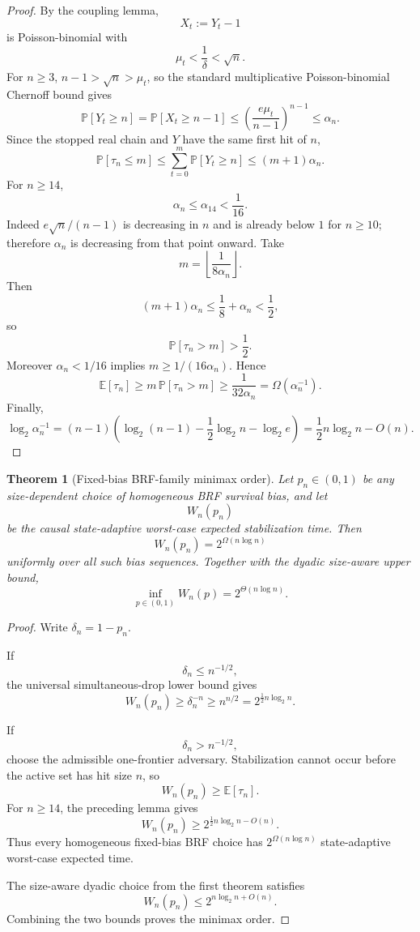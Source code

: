 \documentclass[11pt]{article}
\newtheorem{theorem}{Theorem}
\newcommand{\E}{\mathbb{E}}
\newcommand{\Prb}{\mathbb{P}}
\begin{document}
\begin{proof}
By the coupling lemma,
\[
  X_t:=Y_t-1
\]
is Poisson-binomial with
\[
  \mu_t<\frac1\delta<\sqrt n.
\]
For $n\ge3$, $n-1>\sqrt n>\mu_t$, so the standard multiplicative
Poisson-binomial Chernoff bound gives
\[
  \Prb[Y_t\ge n]
  =
  \Prb[X_t\ge n-1]
  \le
  {\left(
    \frac{e\mu_t}{n-1}
  \right)}^{n-1}
  \le
  \alpha_n.
\]
Since the stopped real chain and $Y$ have the same first hit of $n$,
\[
  \Prb[\tau_n\le m]
  \le
  \sum_{t=0}^{m}\Prb[Y_t\ge n]
  \le
  (m+1)\alpha_n.
\]
For $n\ge14$,
\[
  \alpha_n\le\alpha_{14}<\frac1{16}.
\]
Indeed $e\sqrt n/(n-1)$ is decreasing in $n$ and is already below $1$ for
$n\ge10$; therefore $\alpha_n$ is decreasing from that point onward.
Take
\[
  m=\left\lfloor\frac1{8\alpha_n}\right\rfloor.
\]
Then
\[
  (m+1)\alpha_n
  \le \frac18+\alpha_n
  <\frac12,
\]
so
\[
  \Prb[\tau_n>m]>\frac12.
\]
Moreover $\alpha_n<1/16$ implies
$m\ge 1/(16\alpha_n)$.  Hence
\[
  \E[\tau_n]
  \ge
  m\,\Prb[\tau_n>m]
  \ge
  \frac1{32\alpha_n}
  =
  \Omega(\alpha_n^{-1}).
\]
Finally,
\[
  \log_2\alpha_n^{-1}
  =
  (n-1)\left(
    \log_2(n-1)
    -\frac12\log_2 n
    -\log_2 e
  \right)
  =
  \frac12 n\log_2 n-O(n).
\]
\end{proof}

\begin{theorem}[Fixed-bias BRF-family minimax order]
Let $p_n\in(0,1)$ be any size-dependent choice of homogeneous BRF survival
bias, and let
\[
  W_n(p_n)
\]
be the causal state-adaptive worst-case expected stabilization time.  Then
\[
  W_n(p_n)
  =
  2^{\Omega(n\log n)}
\]
uniformly over all such bias sequences.  Together with the dyadic size-aware
upper bound,
\[
  \inf_{p\in(0,1)} W_n(p)
  =
  2^{\Theta(n\log n)}.
\]
\end{theorem}

\begin{proof}
Write $\delta_n=1-p_n$.

If
\[
  \delta_n\le n^{-1/2},
\]
the universal simultaneous-drop lower bound gives
\[
  W_n(p_n)
  \ge
  \delta_n^{-n}
  \ge
  n^{n/2}
  =
  2^{\frac12 n\log_2 n}.
\]

If
\[
  \delta_n>n^{-1/2},
\]
choose the admissible one-frontier adversary.  Stabilization cannot occur
before the active set has hit size $n$, so
\[
  W_n(p_n)\ge \E[\tau_n].
\]
For $n\ge14$, the preceding lemma gives
\[
  W_n(p_n)
  \ge
  2^{\frac12 n\log_2 n-O(n)}.
\]
Thus every homogeneous fixed-bias BRF choice has
$2^{\Omega(n\log n)}$ state-adaptive worst-case expected time.

The size-aware dyadic choice from the first theorem satisfies
\[
  W_n(p_n)
  \le
  2^{n\log_2 n+O(n)}.
\]
Combining the two bounds proves the minimax order.
\end{proof}
\end{document}
